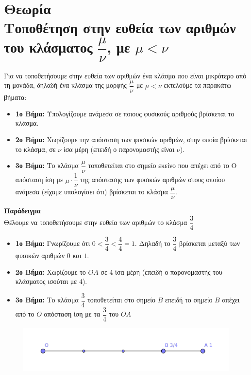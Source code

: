 \documentclass[a4paper,10pt]{report}
\begin{document}
\section*{Θεωρία\\Τοποθέτηση στην ευθεία των αριθμών του κλάσματος $\dfrac{μ}{ν}$, με $μ<ν$ \hfill \small{}}
Για να τοποθετήσουμε στην ευθεία των αριθμών ένα κλάσμα που είναι μικρότερο από τη μονάδα, δηλαδή 
ένα κλάσμα της μορφής $\dfrac{μ}{ν}$ με $μ<ν$ εκτελούμε τα παρακάτω βήματα:
\begin{itemize}
 \item \textbf{1ο Βήμα:} Υπολογίζουμε ανάμεσα σε ποιους φυσικούς αριθμούς βρίσκεται το κλάσμα.
 \item \textbf{2ο Βήμα:} Χωρίζουμε την απόσταση των φυσικών αριθμών, στην οποία βρίσκεται το κλάσμα, 
              σε $ν$ ίσα μέρη (επειδή ο παρονομαστής είναι $ν$).
 \item \textbf{3ο Βήμα:} Το κλάσμα $\dfrac{μ}{ν}$ τοποθετείται στο σημείο εκείνο που απέχει 
               από το Ο απόσταση ίση με $μ\cdot \dfrac{1}{ν}$ της απόστασης των φυσικών αριθμών
               στους οποίου ανάμεσα (είχαμε υπολογίσει ότι) βρίσκεται το κλάσμα $\dfrac{μ}{ν}$. 
\end{itemize}

\textbf{Παράδειγμα} \\
Θέλουμε να τοποθετήσουμε στην ευθεία των αριθμών το κλάσμα $\dfrac{3}{4}$
\begin{itemize}
\item \textbf{1ο Βήμα:} Γνωρίζουμε ότι $0<\dfrac{3}{4}<\dfrac{4}{4}=1$. Δηλαδή το $\dfrac{3}{4}$ βρίσκεται 
      μεταξύ των φυσικών αριθμών $0$ και $1$.
 \item \textbf{2ο Βήμα:} Χωρίζουμε το $ΟΑ$ σε 4 ίσα μέρη (επειδή ο παρονομαστής του κλάσματος ισούται με 4).
 \item \textbf{3ο Βήμα:} Το κλάσμα $\dfrac{3}{4}$ τοποθετείται στο σημείο $Β$ επειδή το σημείο $Β$ απέχει 
       από το $Ο$ απόσταση ίση με τα $\dfrac{3}{4}$ του $ΟΑ$ 
\end{itemize}

\begin{figure}[ht]
\centering
\label{apotelesmata_sel14}
\includegraphics[scale=1]{theoria1.png}
\end{figure}
\end{document}
